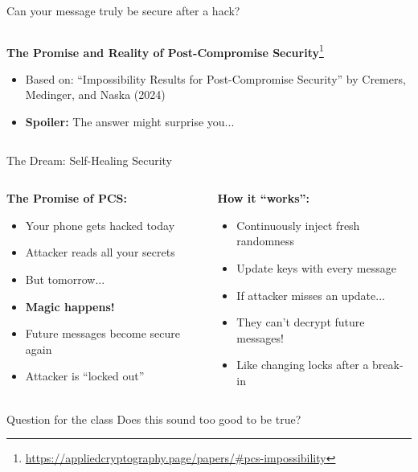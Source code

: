 \documentclass[aspectratio=169, lualatex, handout]{beamer}
\begin{document}
\begin{frame}{Can your message truly be secure after a hack?}
	\begin{columns}[c]
		\begin{column}{1\textwidth}
			\begin{center}
				\Large \textbf{The Promise and Reality of Post-Compromise Security}\footnote{\url{https://appliedcryptography.page/papers/\#pcs-impossibility}}
			\end{center}
			\vspace{1em}
			\begin{itemize}
				\item Based on: ``Impossibility Results for Post-Compromise Security'' by Cremers, Medinger, and Naska (2024)
				\item \textbf{Spoiler:} The answer might surprise you...
			\end{itemize}
		\end{column}
	\end{columns}
\end{frame}

\begin{frame}{The Dream: Self-Healing Security}
	\begin{columns}[c]
		\begin{column}{0.5\textwidth}
			\textbf{The Promise of PCS:}
			\begin{itemize}
				\item Your phone gets hacked today
				\item Attacker reads all your secrets
				\item But tomorrow...
				\item \textbf{Magic happens!}
				\item Future messages become secure again
				\item Attacker is ``locked out''
			\end{itemize}
		\end{column}
		\begin{column}{0.5\textwidth}
			\textbf{How it ``works'':}
			\begin{itemize}
				\item Continuously inject fresh randomness
				\item Update keys with every message
				\item If attacker misses an update...
				\item They can't decrypt future messages!
				\item Like changing locks after a break-in
			\end{itemize}
		\end{column}
	\end{columns}
	\begin{alertblock}{Question for the class}
		Does this sound too good to be true?
	\end{alertblock}
\end{frame}
\end{document}
